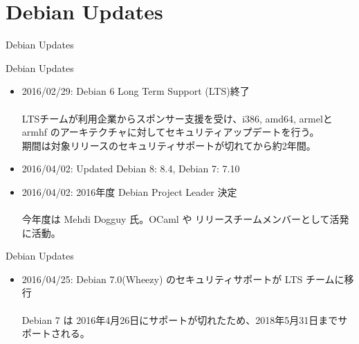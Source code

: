 \section{Debian Updates}
\begin{frame}\begin{center}\Huge{Debian Updates}\end{center}\end{frame}

\begin{frame}{Debian Updates}%

\begin{itemize}[<+->]
\item 2016/02/29: Debian 6 Long Term Support (LTS)終了\\
\ \\
   \small{LTSチームが利用企業からスポンサー支援を受け、i386, amd64, armelとarmhf
   のアーキテクチャに対してセキュリティアップデートを行う。\\
   期間は対象リリースのセキュリティサポートが切れてから約2年間。}
   \pause
\item 2016/04/02: Updated Debian 8: 8.4, Debian 7: 7.10
\item 2016/04/02: 2016年度 Debian Project Leader 決定\\
\ \\
	今年度は Mehdi Dogguy 氏。OCaml や リリースチームメンバーとして活発に活動。
\end{itemize}

\end{frame}

\begin{frame}{Debian Updates}%

\begin{itemize}[<+->]
\item 2016/04/25: Debian 7.0(Wheezy) のセキュリティサポートが LTS チームに移行 \\
\ \\
   \small{Debian 7 は 2016年4月26日にサポートが切れたため、2018年5月31日までサポートされる。}

\end{itemize}
\end{frame}


